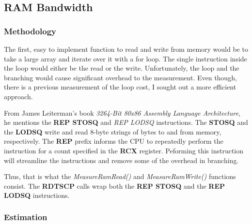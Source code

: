 \documentclass[paper=a4, fontsize=11pt]{scrartcl}
\numberwithin{equation}{section}        %
\numberwithin{figure}{section}          %
\numberwithin{table}{section}               %
\begin{document}
\begin{center}
\end{center}

\subsection{RAM Bandwidth}

\subsubsection{Methodology}

The first, easy to implement function to read and write from memory would be to take a large array and iterate over it with a for loop.  The single instruction inside the loop would either be the read or the write.  Unfortunately, the loop and the branching would cause significant overhead to the measurement.  Even though, there is a previous measurement of the loop cost, I sought out a more efficient approach.

From James Leiterman's book \textit{32\/64-Bit 80x86 Assembly Language Architecture}, he mentions the \textbf{REP STOSQ} and \textit{REP LODSQ} instructions.  The \textbf{STOSQ} and the \textbf{LODSQ} write and read 8-byte strings of bytes to and from memory, respectively.  The \textbf{REP} prefix informs the CPU to repeatedly perform the instruction for a count specified in the \textbf{RCX} register.  Peforming this instruction will streamline the instructions and remove some of the overhead in branching.

Thus, that is what the \textit{MeasureRamRead()} and \textit{MeasureRamWrite()} functions consist.  The \textbf{RDTSCP} calls wrap both the \textbf{REP STOSQ} and the \textbf{REP LODSQ} instructions.

\subsubsection{Estimation}
\end{document}
